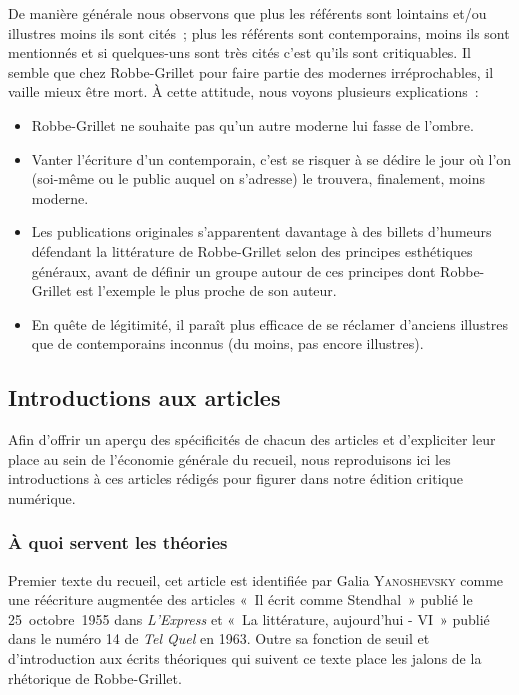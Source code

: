 \documentclass[12pt, a4paper]{article}
\begin{document}
De manière générale nous observons que plus les référents sont lointains et/ou illustres moins ils sont cités~; plus les référents sont contemporains, moins ils sont mentionnés et si quelques-uns sont très cités c'est qu'ils sont critiquables. Il semble que chez Robbe-Grillet pour faire partie des modernes irréprochables, il vaille mieux être mort. À cette attitude, nous voyons plusieurs explications~:
\begin{itemize}
    \item Robbe-Grillet ne souhaite pas qu'un autre moderne lui fasse de l'ombre.
    \item Vanter l'écriture d'un contemporain, c'est se risquer à se dédire le jour où l'on (soi-même ou le public auquel on s'adresse) le trouvera, finalement, moins moderne.
    \item Les publications originales s'apparentent davantage à des billets d'humeurs défendant la littérature de Robbe-Grillet selon des principes esthétiques généraux, avant de définir un groupe autour de ces principes dont Robbe-Grillet est l'exemple le plus proche de son auteur.
    \item En quête de légitimité, il paraît plus efficace de se réclamer d'anciens illustres que de contemporains inconnus (du moins, pas encore illustres).
\end{itemize}




\subsection{Introductions aux articles}

Afin d'offrir un aperçu des spécificités de chacun des articles et d'expliciter leur place au sein de l'économie générale du recueil, nous reproduisons ici les introductions à ces articles rédigés pour figurer dans notre édition critique numérique.
\subsubsection{À quoi servent les théories}
Premier texte du recueil, cet article est identifiée par Galia \textsc{Yanoshevsky} comme une réécriture augmentée des articles «~Il écrit comme Stendhal~» publié le 25~octobre~1955 dans \textit{L'Express} et «~La littérature, aujourd'hui - VI~» publié dans le numéro 14 de \textit{Tel Quel} en 1963. Outre sa fonction de seuil et d'introduction aux écrits théoriques qui suivent ce texte place les jalons de la rhétorique de Robbe-Grillet.
\end{document}
